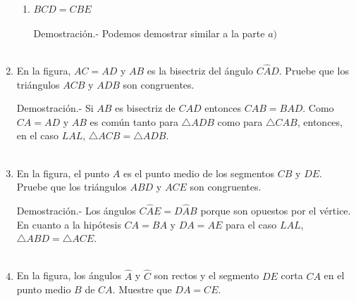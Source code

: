 \begin{enumerate}
\begin{enumerate}[\bfseries a)]
	    \item $BCD=CBE$\\\\
	    Demostración.-\; Podemos demostrar similar a la parte $a)$\\\\

	\end{enumerate}

	\item En la figura, $AC=AD$ y $AB$ es la bisectriz del ángulo $C\widehat{A}D$. Pruebe que los triángulos $ACB$ y $ADB$ son congruentes.
	\begin{center}
	\end{center}

	Demostración.-\; Si $AB$ es bisectriz de $CAD$ entonces $CAB = BAD$. Como $CA = AD$ y $AB$ es común tanto para $\triangle ADB$ como para $\triangle CAB$, entonces, en el caso $LAL$, $\triangle ACB = \triangle ADB$.\\\\

	\item En la figura, el punto $A$ es el punto medio de los segmentos $CB$ y $DE$. Pruebe que los triángulos $ABD$ y $ACE$ son congruentes.
	\begin{center}
	\end{center}

	Demostración.-\; Los ángulos $C\widehat{A}E = D\widehat{A}B$ porque son opuestos por el vértice. En cuanto a la hipótesis $CA = BA$ y $DA = AE$ para el caso $LAL$, $\triangle ABD = \triangle ACE$.\\\\

	\item En la figura, los ángulos $\widehat{A}$ y $\widehat{C}$ son rectos y el segmento $DE$ corta $CA$ en el punto medio $B$ de $CA$. Muestre que $DA=CE$.


\end{enumerate}
